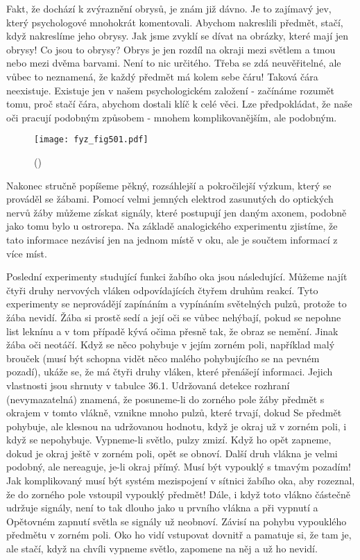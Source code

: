     Fakt, že dochází k zvýraznění obrysů, je znám již dávno. Je to zajímavý jev, který psychologové
    mnohokrát komentovali. Abychom nakreslili předmět, stačí, když nakreslíme jeho obrysy. Jak jsme
    zvyklí se dívat na obrázky, které mají jen obrysy! Co jsou to obrysy? Obrys je jen rozdíl na
    okraji mezi světlem a tmou nebo mezi dvěma barvami. Není to nic určitého. Třeba se zdá
    neuvěřitelné, ale vůbec to neznamená, že každý předmět má kolem sebe čáru! Taková čára
    neexistuje. Existuje jen v našem psychologickém založení - začínáme rozumět tomu, proč stačí
    čára, abychom dostali klíč k celé věci. Lze předpokládat, že naše oči pracují podobným způsobem
    - mnohem komplikovanějším, ale podobným.

    \begin{figure}[ht!] %
      \centering
      \texttt{[image: fyz\_fig501.pdf]}
      \caption{
              (\cite[s.~697]{Feynman01})}
      \label{fyz:fig501}
    \end{figure}

    Nakonec stručně popíšeme pěkný, rozsáhlejší a pokročilejší výzkum, který se prováděl se žábami.
    Pomocí velmi jemných elektrod zasunutých do optických nervů žáby můžeme získat signály, které
    postupují jen daným axonem, podobně jako tomu bylo u ostrorepa. Na základě analogického
    experimentu zjistíme, že tato informace nezávisí jen na jednom místě v oku, ale je součtem
    informací z více míst.
    
    Poslední experimenty studující funkci žabího oka jsou následující. Můžeme najít čtyři druhy
    nervových vláken odpovídajících čtyřem druhům reakcí. Tyto experimenty se neprovádějí zapínáním
    a vypínáním světelných pulzů, protože to žába nevidí. Žába si prostě sedí a její oči se vůbec
    nehýbají, pokud se nepohne list leknínu a v tom případě kývá očima přesně tak, že obraz se
    nemění. Jinak žába oči neotáčí. Když se něco pohybuje v jejím zorném poli, například malý
    brouček (musí být schopna vidět něco malého pohybujícího se na pevném pozadí), ukáže se, že má
    čtyři druhy vláken, které přenášejí informaci. Jejich vlastnosti jsou shrnuty v tabulce 36.1.
    Udržovaná detekce rozhraní (nevymazatelná) znamená, že posuneme-li do zorného pole žáby předmět
    s okrajem v tomto vlákně, vznikne mnoho pulzů, které trvají, dokud Se předmět pohybuje, ale
    klesnou na udržovanou hodnotu, když je okraj už v zorném poli, i když se nepohybuje. Vypneme-li
    světlo, pulzy zmizí. Když ho opět zapneme, dokud je okraj ještě v zorném poli, opět se obnoví.
    Další druh vlákna je velmi podobný, ale nereaguje, je-li okraj přímý. Musí být vypouklý s tmavým
    pozadím! Jak komplikovaný musí být systém mezispojení v sítnici žabího oka, aby rozeznal, že do
    zorného pole vstoupil vypouklý předmět! Dále, i když toto vlákno částečně udržuje signály, není
    to tak dlouho jako u prvního vlákna a při vypnutí a Opětovném zapnutí světla se signály už
    neobnoví. Závisí na pohybu vypouklého předmětu v zorném poli. Oko ho vidí vstupovat dovnitř a
    pamatuje si, že tam je, ale stačí, když na chvíli vypneme světlo, zapomene na něj a už ho
    nevidí.

